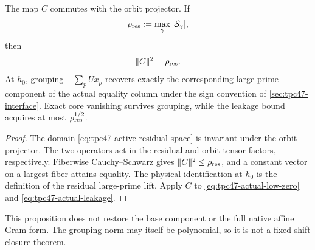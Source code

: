 \begin{proposition}
\label{prop:tpc47-grouped-component}
The map \(C\) commutes with the orbit projector.  If
\begin{equation}
 \rho_{\rm res}:=\max_{\gamma}|\mathcal S_\gamma|,
 \label{eq:tpc47-residual-fiber-multiplicity}
\end{equation}
then
\begin{equation}
 \|C\|^2=\rho_{\rm res}.
 \label{eq:tpc47-grouping-norm}
\end{equation}
At \(h_0\), grouping \(-\sum_pUx_p\) recovers exactly the corresponding
large-prime component of the actual equality column under the sign
convention of \cref{sec:tpc47-interface}.  Exact core vanishing survives
grouping, while the leakage
bound acquires at most \(\rho_{\rm res}^{1/2}\).
\end{proposition}

\begin{proof}
The domain \eqref{eq:tpc47-active-residual-space} is invariant under the
orbit projector.  The two operators act in the residual and orbit
tensor factors, respectively.  Fiberwise Cauchy--Schwarz gives
\(\|C\|^2\le\rho_{\rm res}\), and a constant vector on a largest
fiber attains equality.  The physical identification at \(h_0\) is
the definition of the residual large-prime lift.  Apply \(C\) to
\eqref{eq:tpc47-actual-low-zero} and
\eqref{eq:tpc47-actual-leakage}.
\end{proof}

This proposition does not restore the base component or the full
native affine Gram form.  The grouping norm may itself be polynomial,
so it is not a fixed-shift closure theorem.
